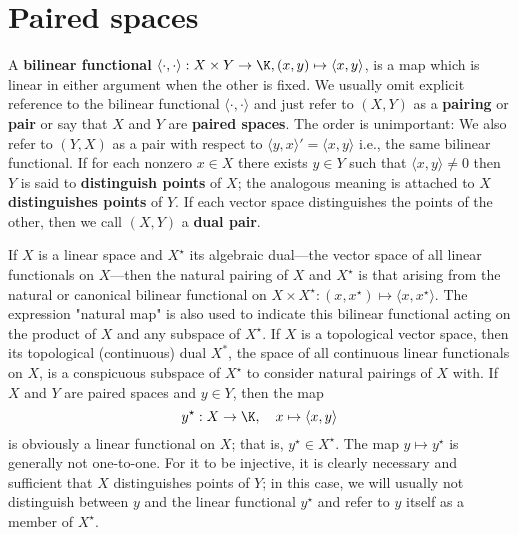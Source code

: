 \section{Paired spaces}
A \textbf{bilinear functional} $\langle\cdot,\cdot\rangle:X\times Y\to\K,(x,y)\mapsto\langle x,y\rangle$, is a map which is linear in either argument when the other is fixed. We usually omit explicit reference to the bilinear functional $\langle\cdot,\cdot\rangle$ and just refer to $(X,Y)$ as a \textbf{pairing} or \textbf{pair} or say that $X$ and $Y$ are \textbf{paired spaces}. The order is unimportant: We also refer to $(Y,X)$ as a pair with respect to $\langle y,x\rangle'=\langle x,y\rangle$ i.e., the same bilinear functional. If for each nonzero $x\in X$ there exists $y\in Y$ such that $\langle x,y\rangle\neq 0$ then $Y$ is said to \textbf{distinguish points} of $X$; the analogous meaning is attached to $X$ \textbf{distinguishes points} of $Y$. If each vector space distinguishes the points of the other, then we call $(X, Y)$ a \textbf{dual pair}.\par
If $X$ is a linear space and $X^{\star}$ its algebraic dual---the vector space of all linear functionals on $X$---then the natural pairing of $X$ and $X^{\star}$ is that arising from the natural or canonical bilinear functional on $X\times X^{\star}:(x,x^{\star})\mapsto\langle x,x^{\star}\rangle$. The expression "natural map" is also used to indicate this bilinear functional acting on the product of $X$ and any subspace of $X^{\star}$. If $X$ is a topological vector space, then its topological (continuous) dual $X^*$, the space of all continuous linear functionals on $X$, is a conspicuous subspace of $X^{\star}$ to consider natural pairings of $X$ with. If $X$ and $Y$ are paired spaces and $y\in Y$, then the map
\[y^{\star}:X\to\K,\quad x\mapsto\langle x,y\rangle\]
is obviously a linear functional on $X$; that is, $y^{\star}\in X^{\star}$. The map $y\mapsto y^{\star}$ is generally not one-to-one. For it to be injective, it is clearly necessary and sufficient that $X$ distinguishes points of $Y$; in this case, we will usually not distinguish between $y$ and the linear functional $y^{\star}$ and refer to $y$ itself as a member of $X^{\star}$.
